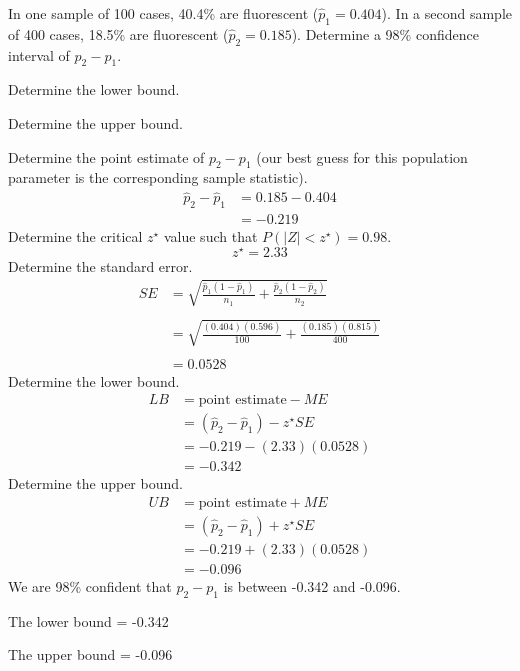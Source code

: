 
\begin{question}
In one sample of 100 cases, 40.4\% are fluorescent
(\(\hat{p}_1 = 0.404\)). In a second sample of 400 cases, 18.5\% are
fluorescent (\(\hat{p}_2 = 0.185\)). Determine a 98\% confidence
interval of \(p_2 - p_1\).
\begin{answerlist}
  \item Determine the lower bound.
  \item Determine the upper bound.
\end{answerlist}
\end{question}

\begin{solution}
Determine the point estimate of \(p_2-p_1\) (our best guess for this
population parameter is the corresponding sample statistic). \[
\begin{aligned}
\hat{p}_2 - \hat{p}_1 &= 0.185 - 0.404 \\
 &= -0.219
\end{aligned}
\] Determine the critical \(z^\star\) value such that
\(P(|Z|<z^\star) = 0.98\). \[z^\star = 2.33\] Determine the standard
error. \[
\begin{aligned}
SE &= \sqrt{\frac{\hat{p}_1(1-\hat{p}_1)}{n_1}+\frac{\hat{p}_2(1-\hat{p}_2)}{n_2}} \\\\
&= \sqrt{\frac{(0.404)(0.596)}{100}+\frac{(0.185)(0.815)}{400}}\\\\
&= 0.0528
\end{aligned}
\] Determine the lower bound. \[
\begin{aligned}
LB &= \text{point estimate} - ME \\
&= (\hat{p}_2 - \hat{p}_1) - z^\star SE \\
&= -0.219 - (2.33)(0.0528) \\
&= -0.342
\end{aligned}
\] Determine the upper bound. \[
\begin{aligned}
UB &= \text{point estimate} + ME \\
&= (\hat{p}_2 - \hat{p}_1) + z^\star SE \\
&= -0.219 + (2.33)(0.0528) \\
&= -0.096
\end{aligned}
\] We are 98\% confident that \(p_2-p_1\) is between -0.342 and -0.096.
\begin{answerlist}
  \item The lower bound = -0.342
  \item The upper bound = -0.096
\end{answerlist}
\end{solution}

